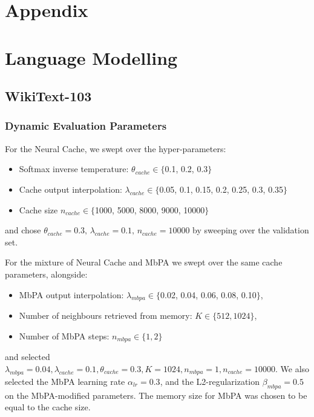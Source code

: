 \documentclass{article} \usepackage{hyperref}
\begin{document}
\newpage
\newpage

\appendix

\onecolumn

\section*{Appendix}

\section{Language Modelling}

\subsection{WikiText-103}
\label{appendix:wikitext}

\subsubsection{Dynamic Evaluation Parameters}
For the Neural Cache, we swept over the hyper-parameters:
\begin{itemize}
\item Softmax inverse temperature: $\theta_{cache} \in \{$0.1, 0.2, 0.3$\}$
\item Cache output interpolation: $\lambda_{cache} \in \{$0.05, 0.1, 0.15, 0.2, 0.25, 0.3, 0.35$\}$
\item Cache size $n_{cache} \in \{$1000, 5000, 8000, 9000, 10000$\}$
\end{itemize}
and chose $\theta_{cache} = 0.3, \, \lambda_{cache} = 0.1, \, n_{cache} = 10000$ by sweeping over the validation set. 

For the mixture of Neural Cache and MbPA we swept over the same cache parameters, alongside:

\begin{itemize}
\item MbPA output interpolation: $\lambda_{mbpa} \in  \{$0.02, 0.04, 0.06, 0.08, 0.10$ \}$,
\item Number of neighbours retrieved from memory: $K \in \{512, 1024\}$,
\item Number of MbPA steps: $n_{mbpa} \in \{1, 2 \}$
\end{itemize}

and selected $\lambda_{mbpa} = 0.04, \lambda_{cache} = 0.1, \theta_{cache} = 0.3, K = 1024, n_{mbpa} = 1, n_{cache} = 10000$. We also selected the MbPA learning rate $\alpha_{lr} = 0.3$, and the L2-regularization $\beta_{mbpa} = 0.5$ on the MbPA-modified parameters. The memory size for MbPA was chosen to be equal to the cache size.
\end{document}
